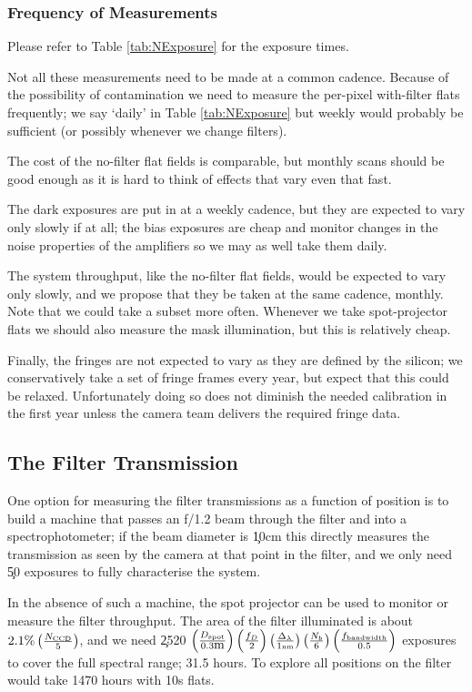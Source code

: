 \subsubsection{Frequency of Measurements}

Please refer to Table \ref{tab:NExposure} for the exposure times.

Not all these measurements need to be made at a common cadence.  Because of the possibility of contamination
we need to measure the per-pixel with-filter flats frequently; we say `daily' in Table \ref{tab:NExposure} but
weekly would probably be sufficient (or possibly whenever we change filters).

The cost of the no-filter flat fields is comparable, but monthly scans should be good enough
as it is hard to think of effects that vary even that fast.

The dark exposures are put in at a weekly cadence, but they are expected to vary only slowly if at all;
the bias exposures are cheap and monitor changes in the noise properties of the amplifiers so we may
as well take them daily.

The system throughput, like the no-filter flat fields, would be expected to vary only slowly, and we
propose that they be taken at the same cadence, monthly.  Note that we could take a subset more often.
Whenever we take spot-projector flats we should also measure the mask illumination, but this is relatively
cheap.

Finally, the fringes are not expected to vary as they are defined by the silicon; we conservatively
take a set of fringe frames every year, but expect that this could be relaxed.  Unfortunately doing
so does not diminish the needed calibration in the first year unless the camera team delivers the
required fringe data.

\subsection{The Filter Transmission}
\label{sec:MeasureFilters}

One option for measuring the filter transmissions as a function of position is to build a machine that
passes an f/1.2 beam through the filter and into a spectrophotometer; if the beam diameter is \c 10cm
this directly measures the transmission as seen by the camera at that point in the filter, and we only
need \c 50 exposures to fully characterise the system.

In the absence of such a machine,
the spot projector can be used to monitor or measure the filter throughput. The area of the filter illuminated
is about $2.1\% \left(\frac{N_{\mbox{\tiny CCD}}}{5}\right)$, and we need \c 2520 $\left(\frac{D_{\mbox{\tiny spot}}}{0.3\mbox{m}}\right) \left(\frac{f_D}{2}\right) \left(\frac{\Delta_\lambda}{1\mbox{\tiny nm}}\right) \left(\frac{N_b}{6}\right)
\left(\frac{f_{\mbox{\tiny bandwidth}}}{0.5}\right)$ exposures to cover the full spectral range; 31.5 hours.  To explore all positions on the
filter would take 1470 hours with 10s flats.

